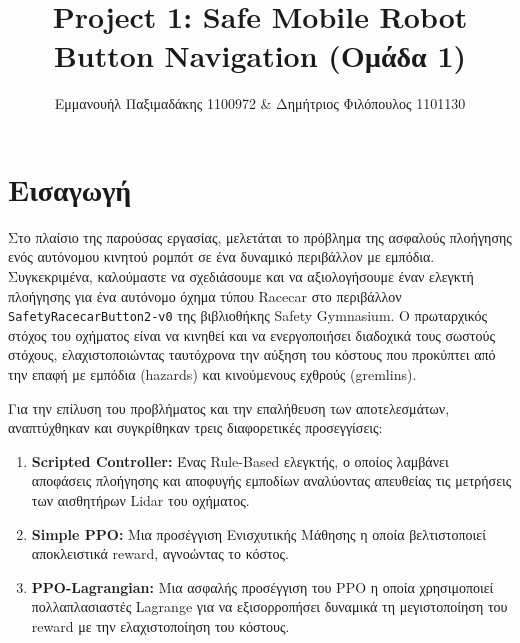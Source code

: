 \documentclass[acmsmall,screen,nonacm]{acmart}
\title{Project 1: Safe Mobile Robot Button Navigation (Ομάδα 1)}
\author{Εμμανουήλ Παξιμαδάκης 1100972 \& Δημήτριος Φιλόπουλος 1101130}
\affiliation{
	\institution{\newline Τμήμα ΗΜ\&ΤΥ, Πανεπιστήμιο Πατρών}
	\country{Ελλάδα}
}
\begin{document}
	\maketitle
	
	
	\tableofcontents
	
	\newpage
	
	\section{Εισαγωγή}
	Στο πλαίσιο της παρούσας εργασίας, μελετάται το πρόβλημα της ασφαλούς πλοήγησης ενός αυτόνομου κινητού ρομπότ σε ένα δυναμικό περιβάλλον με εμπόδια. Συγκεκριμένα, καλούμαστε να σχεδιάσουμε και να αξιολογήσουμε έναν ελεγκτή πλοήγησης για ένα αυτόνομο όχημα τύπου Racecar στο περιβάλλον \texttt{SafetyRacecarButton2-v0} της βιβλιοθήκης Safety Gymnasium. Ο πρωταρχικός στόχος του οχήματος είναι να κινηθεί και να ενεργοποιήσει διαδοχικά τους σωστούς στόχους, ελαχιστοποιώντας ταυτόχρονα την αύξηση του κόστους που προκύπτει από την επαφή με εμπόδια (hazards) και κινούμενους εχθρούς (gremlins).
	
	Για την επίλυση του προβλήματος και την επαλήθευση των αποτελεσμάτων, αναπτύχθηκαν και συγκρίθηκαν τρεις διαφορετικές προσεγγίσεις:
	\begin{enumerate}
		\item \textbf{Scripted Controller:} Ένας Rule-Based ελεγκτής, ο οποίος λαμβάνει αποφάσεις πλοήγησης και αποφυγής εμποδίων αναλύοντας απευθείας τις μετρήσεις των αισθητήρων Lidar του οχήματος.
		\item \textbf{Simple PPO:} Μια προσέγγιση Ενισχυτικής Μάθησης η οποία βελτιστοποιεί αποκλειστικά reward, αγνοώντας το κόστος.
		\item \textbf{PPO-Lagrangian:} Μια ασφαλής προσέγγιση του PPO η οποία χρησιμοποιεί πολλαπλασιαστές Lagrange για να εξισορροπήσει δυναμικά τη μεγιστοποίηση του reward με την ελαχιστοποίηση του κόστους.
	\end{enumerate}
\end{document}
